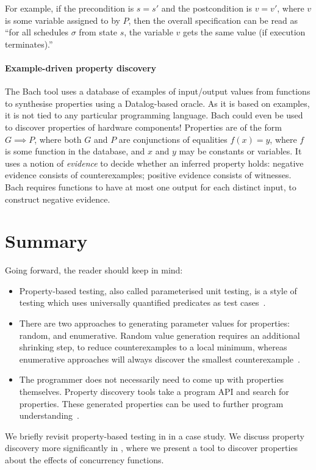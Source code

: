 \noindent
For example, if the precondition is $s = s'$ and the postcondition is
$v = v'$, where $v$ is some variable assigned to by $P$, then the
overall specification can be read as ``for all schedules $\sigma$ from
state $s$, the variable $v$ gets the same value (if execution
terminates).''

\paragraph{Example-driven property discovery}
The Bach \parencite{smith2017} tool uses a database of examples of
input/output values from functions to synthesise properties using a
Datalog-based oracle.  As it is based on examples, it is not tied to
any particular programming language.  Bach could even be used to
discover properties of hardware components!  Properties are of the
form $G \implies P$, where both $G$ and $P$ are conjunctions of
equalities $f(x) = y$, where $f$ is some function in the database, and
$x$ and $y$ may be constants or variables.  It uses a notion of
\emph{evidence} to decide whether an inferred property holds: negative
evidence consists of counterexamples; positive evidence consists of
witnesses.  Bach requires functions to have at most one output for
each distinct input, to construct negative evidence.

\section{Summary}

Going forward, the reader should keep in mind:

\begin{itemize}
\item Property-based testing, also called parameterised unit testing,
  is a style of testing which uses universally quantified predicates
  as test cases~.

\item There are two approaches to generating parameter values for
  properties: random, and enumerative.  Random value generation
  requires an additional shrinking step, to reduce counterexamples to
  a local minimum, whereas enumerative approaches will always discover
  the smallest counterexample~.

\item The programmer does not necessarily need to come up with
  properties themselves.  Property discovery tools take a program API
  and search for properties.  These generated properties can be used
  to further program understanding~.
\end{itemize}

We briefly revisit property-based testing in  in a
case study.  We discuss property discovery more significantly in
, where we present a tool to discover properties about
the effects of concurrency functions.
